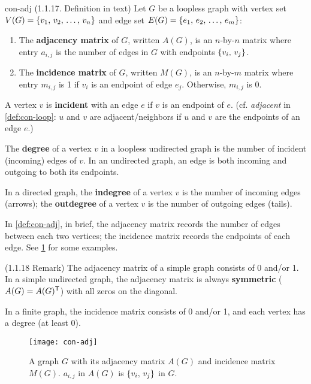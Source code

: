 \documentclass[../src/handouts/main.tex]{subfiles}
\begin{document}
\begin{definition}{}{con-adj}
  (1.1.17. Definition in text)
  Let $G$ be a loopless graph with vertex set $V(G) = \lbrace v_1,\, v_2,\, \ldots,\, v_n\rbrace$ and edge set $E(G) = \lbrace e_1,\, e_2,\, \ldots,\, e_m\rbrace$:

  \begin{enumerate}
    \item The \textbf{adjacency matrix} of $G$, written $A(G)$, is an $n$-by-$n$ matrix where entry $a_{i,j}$ is the number of edges in $G$ with endpoints $\lbrace v_i,\, v_j\rbrace$.
    \item The \textbf{incidence matrix} of $G$, written $M(G)$, is an $n$-by-$m$ matrix where entry $m_{i,j}$ is 1 if $v_i$ is an endpoint of edge $e_j$. Otherwise, $m_{i,j}$ is 0.
  \end{enumerate}

  A vertex $v$ is \textbf{incident} with an edge $e$ if $v$ is an endpoint of $e$. (cf. \textit{adjacent} in \cref{def:con-loop}: $u$ and $v$ are adjacent/neighbors if $u$ and $v$ are the endpoints of an edge $e$.)

  The \textbf{degree} of a vertex $v$ in a loopless undirected graph is the number of incident (incoming) edges of $v$. In an undirected graph, an edge is both incoming and outgoing to both its endpoints.

  In a directed graph, the \textbf{indegree} of a vertex $v$ is the number of incoming edges (arrows); the \textbf{outdegree} of a vertex $v$ is the number of outgoing edges (tails).
\end{definition}

In \cref{def:con-adj}, in brief, the adjacency matrix records the number of edges between each two vertices; the incidence matrix records the endpoints of each edge. See \cref{fig:con-adj} for some examples.

(1.1.18 Remark) The adjacency matrix of a simple graph consists of 0 and/or 1. In a simple undirected graph, the adjacency matrix is always \textbf{symmetric} ($A(G) = A(G)^{\mathsf{T}}$) with all zeros on the diagonal.

In a finite graph, the incidence matrix consists of 0 and/or 1, and each vertex has a degree (at least 0).

\begin{figure}[ht]
  \centering
  \texttt{[image: con-adj]}
  \caption{A graph $G$ with its adjacency matrix $A(G)$ and incidence matrix $M(G)$. $a_{i,j}$ in $A(G)$ is $\lbrace v_i,\, v_j\rbrace$ in $G$.}
  \label{fig:con-adj}
\end{figure}
\end{document}

